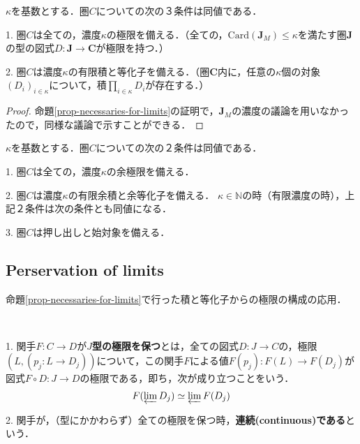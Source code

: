 \documentclass[uplatex, 12pt, dvipdfmx]{jsarticle}
\begin{document}
\vspace{3cm}

\begin{corollary}\label{corollary-necessarilies-for-limits}
    $\kappa$を基数とする．圏$C$についての次の３条件は同値である．

    1. 圏$C$は全ての，濃度$\kappa$の極限を備える．（全ての，$\mathrm{Card}(\mathbf{J}_M)\le\kappa$を満たす圏$\mathbf{J}$の型の図式$D:\mathbf{J}\to\mathbf{C}$が極限を持つ．）

    2. 圏$C$は濃度$\kappa$の有限積と等化子を備える．（圏$\mathbf{C}$内に，任意の$\kappa$個の対象$(D_i)_{i\in\kappa}$について，積$\prod_{i\in\kappa}D_i$が存在する．）
\end{corollary}
\begin{proof}
    命題\ref{prop-necessaries-for-limits}の証明で，$\mathbf{J}_M$の濃度の議論を用いなかったので，同様な議論で示すことができる．
\end{proof}

\vspace{3cm}

\begin{theorem}[余極限を持つための条件]
    $\kappa$を基数とする．圏$C$についての次の２条件は同値である．

    1. 圏$C$は全ての，濃度$\kappa$の余極限を備える．

    2. 圏$C$は濃度$\kappa$の有限余積と余等化子を備える．
    \noindent
    $\kappa\in\mathbb{N}$の時（有限濃度の時），上記２条件は次の条件とも同値になる．

    3. 圏$C$は押し出しと始対象を備える．
\end{theorem}

\vspace{3cm}

\subsection{Perservation of limits}
命題\ref{prop-necessaries-for-limits}で行った積と等化子からの極限の構成の応用．

\begin{definition}　

    1. 関手$F:C\to D$が\textbf{$J$型の極限を保つ}とは，全ての図式$D:J\to C$の，極限$(L,(p_j:L\to D_j))$について，この関手$F$による値$F(p_j):F(L)\to F(D_j)$が図式$F\circ D:J\to D$の極限である，即ち，次が成り立つことをいう．
    \[ F(\varprojlim D_j)\simeq \varprojlim F(D_j) \]

    2. 関手が，（型にかかわらず）全ての極限を保つ時，\textbf{連続(continuous)である}という．
\end{definition}
\end{document}
